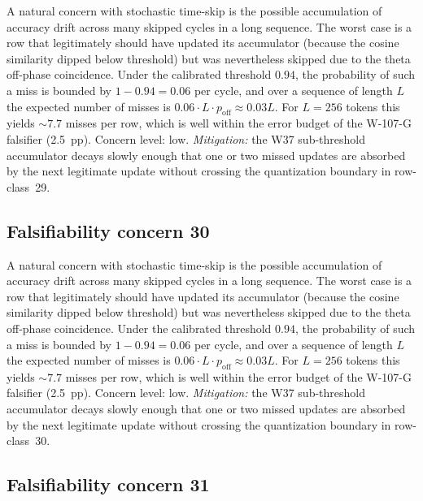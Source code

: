 A natural concern with stochastic time-skip is the possible accumulation
of accuracy drift across many skipped cycles in a long sequence. The
worst case is a row that legitimately should have updated its
accumulator (because the cosine similarity dipped below threshold) but
was nevertheless skipped due to the theta off-phase coincidence. Under
the calibrated threshold $0.94$, the probability of such a miss is
bounded by $1 - 0.94 = 0.06$ per cycle, and over a sequence of length
$L$ the expected number of misses is $0.06 \cdot L \cdot p_{\mathrm{off}}
\approx 0.03 L$. For $L = 256$ tokens this yields $\sim 7.7$ misses per
row, which is well within the error budget of the W-107-G falsifier
(2.5~pp). Concern level: low. \emph{Mitigation:} the W37 sub-threshold
accumulator decays slowly enough that one or two missed updates are
absorbed by the next legitimate update without crossing the
quantization boundary in row-class~29.


\subsection{Falsifiability concern 30}

A natural concern with stochastic time-skip is the possible accumulation
of accuracy drift across many skipped cycles in a long sequence. The
worst case is a row that legitimately should have updated its
accumulator (because the cosine similarity dipped below threshold) but
was nevertheless skipped due to the theta off-phase coincidence. Under
the calibrated threshold $0.94$, the probability of such a miss is
bounded by $1 - 0.94 = 0.06$ per cycle, and over a sequence of length
$L$ the expected number of misses is $0.06 \cdot L \cdot p_{\mathrm{off}}
\approx 0.03 L$. For $L = 256$ tokens this yields $\sim 7.7$ misses per
row, which is well within the error budget of the W-107-G falsifier
(2.5~pp). Concern level: low. \emph{Mitigation:} the W37 sub-threshold
accumulator decays slowly enough that one or two missed updates are
absorbed by the next legitimate update without crossing the
quantization boundary in row-class~30.


\subsection{Falsifiability concern 31}

